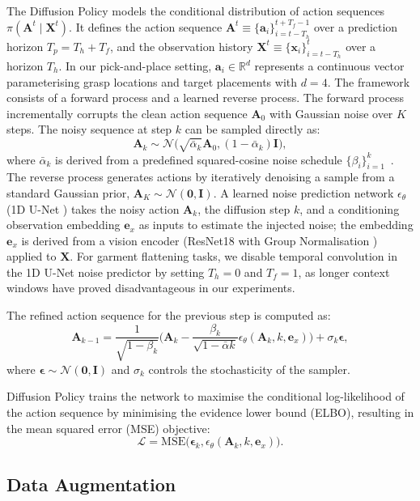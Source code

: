 \documentclass[journal]{IEEEtran}
\newcommand{\addinfo}[1]{\textcolor{myPurple}{#1}}
\begin{document}
\addinfo{The Diffusion Policy models the conditional distribution of action sequences $\pi(\bm{A}^t \mid \bm{X}^t)$. It defines the action sequence $\bm{A}^t \equiv \{\bm{a}_i\}_{i=t-T_h}^{t+T_f-1}$ over a prediction horizon $T_p = T_h + T_f$, and the observation history $\bm{X}^t \equiv \{\bm{x}_i\}_{i=t-T_h}^{t}$ over a horizon $T_h$. In our pick-and-place setting, $\bm{a}_i \in \mathbb{R}^d$ represents a continuous vector parameterising grasp locations and target placements with $d=4$.
The framework consists of a forward process and a learned reverse process. The forward process incrementally corrupts the clean action sequence $\bm{A}_0$ with Gaussian noise over $K$ steps. The noisy sequence at step $k$ can be sampled directly as:
\begin{equation}
\bm{A}_k \sim \mathcal{N}\big(\sqrt{\bar{\alpha}_k}\bm{A}_0, (1 - \bar{\alpha}_k)\bm{I}\big),
\end{equation}
where $\bar{\alpha}_k$ is derived from a predefined squared-cosine noise schedule $\{\beta_i\}_{i=1}^k$~\cite{nichol2021improved}.
The reverse process generates actions by iteratively denoising a sample from a standard Gaussian prior, $\bm{A}_K \sim \mathcal{N}(\bm{0}, \bm{I})$. A learned noise prediction network $\epsilon_\theta$ (1D U-Net \cite{ronneberger2015u}) takes the noisy action $\bm{A}_k$, the diffusion step $k$, and a conditioning observation embedding $\bm{e}_x$ as inputs to estimate the injected noise; the embedding $\bm{e}_x$ is derived from a vision encoder (ResNet18 \cite{he2016deep} with Group Normalisation \cite{wu2018group}) applied to $\bm{X}$. For garment flattening tasks, we disable temporal convolution in the 1D U-Net noise predictor by setting $T_h = 0$ and $T_f = 1$, as longer context windows have proved disadvantageous in our experiments.}

\addinfo{The refined action sequence for the previous step is computed as:
\begin{equation}
\bm{A}_{k-1} =
\frac{1}{\sqrt{1 - \beta_k}}
\Big(
\bm{A}_k -
\frac{\beta_k}{\sqrt{1 - \bar{\alpha}k}}
\epsilon_\theta(\bm{A}_k, k, \bm{e}_x)
\Big)
+ \sigma_k \boldsymbol{\epsilon},
\end{equation}
where $\boldsymbol{\epsilon} \sim \mathcal{N}(\bm{0}, \bm{I})$ and $\sigma_k$ controls the stochasticity of the sampler.}

\addinfo{Diffusion Policy trains the network to maximise the conditional log-likelihood of the action sequence by minimising the evidence lower bound (ELBO), resulting in the mean squared error (MSE) objective:
\begin{equation}
\mathcal{L} = \mathrm{MSE}\Big(\boldsymbol{\epsilon}_k, \epsilon_\theta(\bm{A}_k, k, \bm{e}_x)\Big).
\label{eqn:diffusion-policy-loss}
\end{equation}}
\addinfo{\subsection{Data Augmentation} \label{sec:data-aug}}
\end{document}
